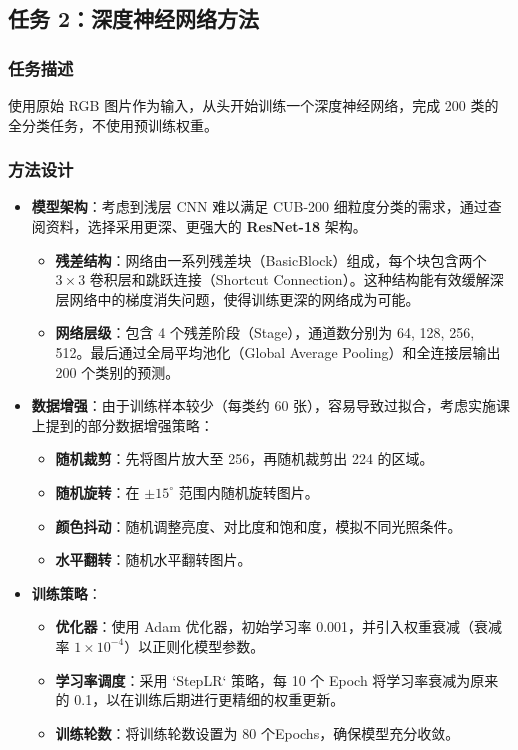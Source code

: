 \documentclass[UTF8]{ctexart}
\begin{document}
\subsection{任务 2：深度神经网络方法}
\subsubsection{任务描述}
使用原始 RGB 图片作为输入，从头开始训练一个深度神经网络，完成 200 类的全分类任务，不使用预训练权重。

\subsubsection{方法设计}
\begin{itemize}
    \item \textbf{模型架构}：考虑到浅层 CNN 难以满足 CUB-200 细粒度分类的需求，通过查阅资料，选择采用更深、更强大的 \textbf{ResNet-18} 架构。
    \begin{itemize}
        \item \textbf{残差结构}：网络由一系列残差块（BasicBlock）组成，每个块包含两个 $3 \times 3$ 卷积层和跳跃连接（Shortcut Connection）。这种结构能有效缓解深层网络中的梯度消失问题，使得训练更深的网络成为可能。
        \item \textbf{网络层级}：包含 4 个残差阶段（Stage），通道数分别为 64, 128, 256, 512。最后通过全局平均池化（Global Average Pooling）和全连接层输出 200 个类别的预测。
    \end{itemize}
    \item \textbf{数据增强}：由于训练样本较少（每类约 60 张），容易导致过拟合，考虑实施课上提到的部分数据增强策略：
    \begin{itemize}
        \item \textbf{随机裁剪}：先将图片放大至 256，再随机裁剪出 224 的区域。
        \item \textbf{随机旋转}：在 $\pm 15^\circ$ 范围内随机旋转图片。
        \item \textbf{颜色抖动}：随机调整亮度、对比度和饱和度，模拟不同光照条件。
        \item \textbf{水平翻转}：随机水平翻转图片。
    \end{itemize}
    \item \textbf{训练策略}：
    \begin{itemize}
        \item \textbf{优化器}：使用 Adam 优化器，初始学习率 0.001，并引入权重衰减（衰减率 $1 \times 10^{-4}$）以正则化模型参数。
        \item \textbf{学习率调度}：采用 `StepLR` 策略，每 10 个 Epoch 将学习率衰减为原来的 0.1，以在训练后期进行更精细的权重更新。
        \item \textbf{训练轮数}：将训练轮数设置为 80 个Epochs，确保模型充分收敛。
    \end{itemize}
\end{itemize}
\end{document}
